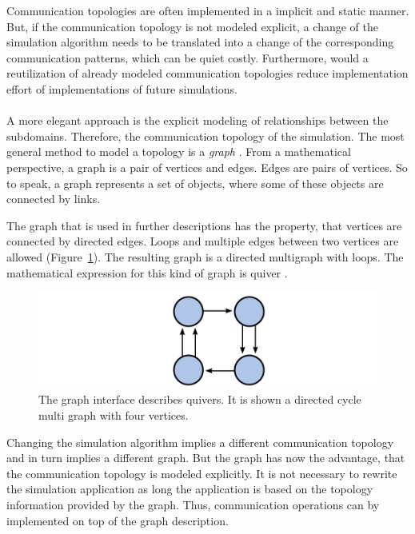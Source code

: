Communication topologies are often implemented in a implicit and
static manner.  But, if the communication topology is not modeled
explicit, a change of the simulation algorithm needs to be translated
into a change of the corresponding communication patterns, which can
be quiet costly. Furthermore, would a reutilization of already modeled
communication topologies reduce implementation effort of
implementations of future simulations.

\paragraph*{}
A more elegant approach is the explicit modeling of relationships
between the subdomains. Therefore, the communication topology of the
simulation. The most general method to model a topology is a
\emph{graph} \cite{ref:graph}.  From a mathematical perspective, a
graph is a pair of vertices and edges. Edges are pairs of vertices. So
to speak, a graph represents a set of objects, where some of these
objects are connected by links.

The graph that is used in further descriptions has the property, that
vertices are connected by directed edges. Loops and multiple edges
between two vertices are allowed (Figure~\ref{fig:graph}). The
resulting graph is a directed multigraph with loops. The mathematical
expression for this kind of graph is quiver \cite{ref:quiver}.

\begin{figure}[H]
  \centering \includegraphics[width=\textwidth]{graphics/30_graph}
  \caption{The graph interface describes quivers. It is shown a
    directed cycle multi graph with four vertices.}
  \label{fig:graph}
\end{figure}

Changing the simulation algorithm implies a different communication
topology and in turn implies a different graph.  But the graph has now
the advantage, that the communication topology is modeled
explicitly. It is not necessary to rewrite the simulation application
as long the application is based on the topology information provided
by the graph. Thus, communication operations can by implemented on top
of the graph description.

